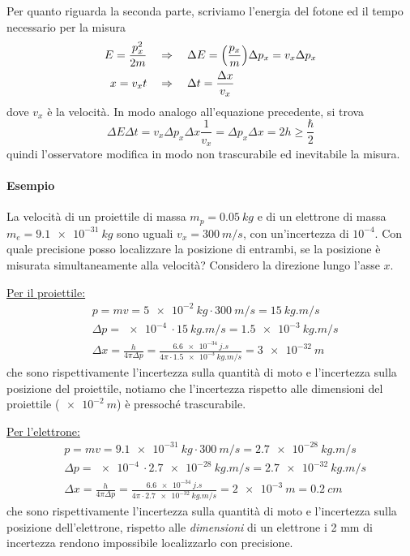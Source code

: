 Per quanto riguarda la seconda parte, scriviamo l'energia del fotone ed il tempo necessario per la misura
\begin{equation}
\begin{split}
E = \frac{ p_x^2}{2m }
& \quad\Rightarrow\quad  \Delta E = \Bigl(  \frac{ p_x}{m }  \Bigr) \Delta p_x = v_x \Delta p_x \\
x = v_x  t 
& \quad\Rightarrow\quad  \Delta t = \frac{ \Delta x}{v_x }
\end{split}
\end{equation}
dove $v_x$ è la velocità. 
In modo analogo all'equazione precedente, si trova
\begin{equation}
\Delta E \Delta t =  v_x \Delta p_x  \Delta x \frac{1}{v_x} = \Delta p_x \Delta x = 2h \ge \frac{ \hbar}{2 }
\end{equation}
quindi l'osservatore modifica in modo non trascurabile ed inevitabile la misura.

\paragraph{Esempio} La velocità di un proiettile di massa $m_p = \SI{0.05}{kg}$ e di un elettrone di massa $m_e = \SI{9.1e-31}{kg}$ sono uguali $v_x = \SI{300}{m/s}$, con un'incertezza di $10^{-4}$.
Con quale precisione posso localizzare la posizione di entrambi, se la posizione è misurata simultaneamente alla velocità?
Considero la direzione lungo l'asse $x$.

\underline{Per il proiettile:}
\begin{equation}
\begin{split}
& p = m v = \SI{5e-2}{kg} \cdot \SI{300}{m/s} = \SI{15}{kg.m/s} \\
& \Delta p = \SI{e-4}{} \cdot \SI{15}{kg.m/s} = \SI{1.5e-3}{kg.m/s} \\
& \Delta x = \frac{ h}{4\pi \Delta p } = \frac{ \SI{6.6e-34}{j.s}}{4\pi \cdot \SI{1.5e-3}{kg.m/s} } = \SI{3e-32}{m}
\end{split}
\end{equation}
che sono rispettivamente l'incertezza sulla quantità di moto e l'incertezza sulla posizione del proiettile, notiamo che l'incertezza rispetto alle dimensioni del proiettile ($\SI{e-2}{m}$) è pressoché trascurabile.

\underline{Per l'elettrone:}
\begin{equation}
\begin{split}
& p = m v = \SI{9.1e-31}{kg} \cdot \SI{300}{m/s} = \SI{2.7e-28}{kg.m/s} \\
& \Delta p = \SI{e-4}{} \cdot \SI{2.7e-28}{kg.m/s} = \SI{2.7e-32}{kg.m/s} \\
& \Delta x = \frac{ h}{4\pi \Delta p } = \frac{ \SI{6.6e-34}{j.s}}{4\pi \cdot \SI{2.7e-32}{kg.m/s} } = \SI{2e-3}{m} = \SI{0.2}{cm}
\end{split}
\end{equation}
che sono rispettivamente l'incertezza sulla quantità di moto e l'incertezza sulla posizione dell'elettrone, rispetto alle \textit{dimensioni} di un elettrone i 2 mm di incertezza rendono impossibile localizzarlo con precisione.

